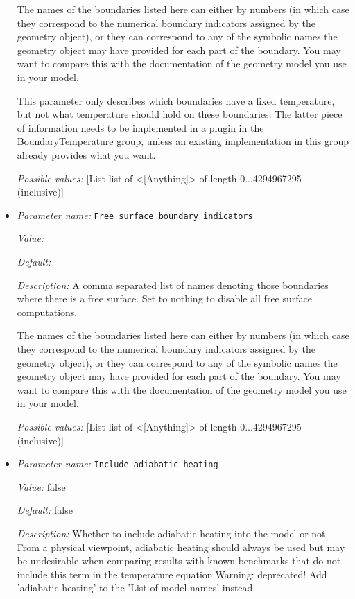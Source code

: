 \begin{itemize}
The names of the boundaries listed here can either by numbers (in which case they correspond to the numerical boundary indicators assigned by the geometry object), or they can correspond to any of the symbolic names the geometry object may have provided for each part of the boundary. You may want to compare this with the documentation of the geometry model you use in your model.

This parameter only describes which boundaries have a fixed temperature, but not what temperature should hold on these boundaries. The latter piece of information needs to be implemented in a plugin in the BoundaryTemperature group, unless an existing implementation in this group already provides what you want.


{\it Possible values:} [List list of <[Anything]> of length 0...4294967295 (inclusive)]
\item {\it Parameter name:} {\tt Free surface boundary indicators}
\label{parameters:Model settings/Free surface boundary indicators}


{\it Value:} 


{\it Default:} 


{\it Description:} A comma separated list of names denoting those boundaries where there is a free surface. Set to nothing to disable all free surface computations.

The names of the boundaries listed here can either by numbers (in which case they correspond to the numerical boundary indicators assigned by the geometry object), or they can correspond to any of the symbolic names the geometry object may have provided for each part of the boundary. You may want to compare this with the documentation of the geometry model you use in your model.


{\it Possible values:} [List list of <[Anything]> of length 0...4294967295 (inclusive)]
\item {\it Parameter name:} {\tt Include adiabatic heating}
\label{parameters:Model settings/Include adiabatic heating}


{\it Value:} false


{\it Default:} false


{\it Description:} Whether to include adiabatic heating into the model or not. From a physical viewpoint, adiabatic heating should always be used but may be undesirable when comparing results with known benchmarks that do not include this term in the temperature equation.Warning: deprecated! Add 'adiabatic heating' to the 'List of model names' instead.



\end{itemize}
